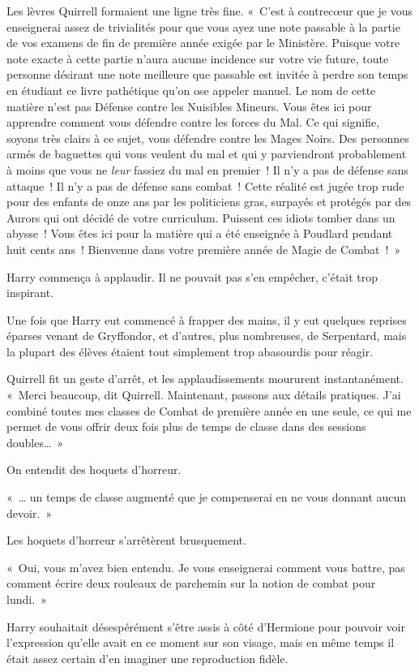 Les lèvres Quirrell formaient une ligne très fine.
«~C'est à contrecœur que je vous enseignerai assez de trivialités pour que vous ayez une note passable à la partie de vos examens de fin de première année exigée par le Ministère.
Puisque votre note exacte à cette partie n'aura aucune incidence sur votre vie future, toute personne désirant une note meilleure que passable est invitée à perdre son temps en étudiant ce livre pathétique qu'on ose appeler manuel.
Le nom de cette matière n'est pas Défense contre les Nuisibles Mineurs.
Vous êtes ici pour apprendre comment vous défendre contre les forces du Mal.
Ce qui signifie, soyons très clairs à ce sujet, vous défendre contre les Mages Noirs.
Des personnes armés de baguettes qui vous veulent du mal et qui y parviendront probablement à moins que vous ne \emph{leur} fassiez du mal en premier~!
Il n'y a pas de défense sans attaque~!
Il n'y a pas de défense sans combat~!
Cette réalité est jugée trop rude pour des enfants de onze ans par les politiciens gras, surpayés et protégés par des Aurors qui ont décidé de votre curriculum.
Puissent ces idiots tomber dans un abysse~!
Vous êtes ici pour la matière qui a été enseignée à Poudlard pendant huit cents ans~!
Bienvenue dans votre première année de Magie de Combat~!~»

Harry commença à applaudir.
Il ne pouvait pas s'en empêcher, c'était trop inspirant.

Une fois que Harry eut commencé à frapper des mains, il y eut quelques reprises éparses venant de Gryffondor, et d'autres, plus nombreuses, de Serpentard, mais la plupart des élèves étaient tout simplement trop abasourdis pour réagir.

Quirrell fit un geste d'arrêt, et les applaudissements moururent instantanément.
«~Merci beaucoup, dit Quirrell. Maintenant, passons aux détails pratiques.
J'ai combiné toutes mes classes de Combat de première année en une seule, ce qui me permet de vous offrir deux fois plus de temps de classe dans des sessions doubles…~»

On entendit des hoquets d'horreur.

«~… un temps de classe augmenté que je compenserai en ne vous donnant aucun devoir.~»

Les hoquets d'horreur s'arrêtèrent brusquement.

«~Oui, vous m'avez bien entendu.
Je vous enseignerai comment vous battre, pas comment écrire deux rouleaux de parchemin sur la notion de combat pour lundi.~»

Harry souhaitait désespérément s'être assis à côté d'Hermione pour pouvoir voir l'expression qu'elle avait en ce moment sur son visage, mais en même temps il était assez certain d'en imaginer une reproduction fidèle.

